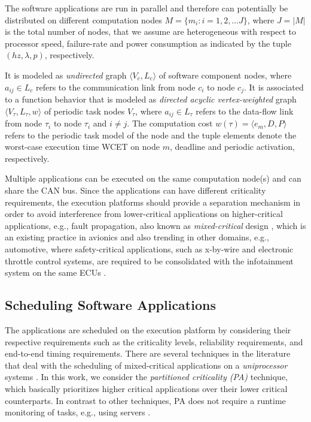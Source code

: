 The software applications are run in parallel and therefore can potentially be distributed on different computation nodes $M =\{m_i:i=1,2,\dots J\}$, where $J=|M|$ is the total number of nodes, that we assume are heterogeneous with respect to processor speed, failure-rate and power consumption as indicated by the tuple $(hz, \lambda, p)$, respectively. 

\begin{definition}
It is modeled as \textit{undirected} graph $\langle V_c,L_c\rangle$ of software component nodes, where $a_{ij}\in L_c$ refers to the communication link from node $c_i$ to node $c_j$. It is associated to a function behavior that is modeled as \textit{directed acyclic vertex-weighted} graph $\langle V_\tau,L_\tau, w\rangle$ of periodic task nodes $V_\tau$, where $a_{ij}\in L_\tau$ refers to the data-flow link from node $\tau_i$ to node $\tau_i$ and $i \neq j$. The computation cost $w(\tau)=\langle e_m,D,P\rangle$ refers to the periodic task model of the node and the tuple elements denote the worst-case execution time {WCET} on node $m$, deadline and periodic activation, respectively.
\end{definition}

Multiple applications can be executed on the same computation node(s) and can share the CAN bus. Since the applications can have different criticality requirements, the execution platforms should provide a separation mechanism in order to avoid interference from lower-critical applications on higher-critical applications, e.g., fault propagation, also known as   \textit{mixed-critical} design \cite{Vestal2007PreemptiveAssurance}, which is an existing practice in avionics and also trending in other domains, e.g., automotive, where  safety-critical applications, such as x-by-wire and electronic throttle control systems, are required to be consolidated with the infotainment system on the same ECUs \cite{bibid}.

\subsection{Scheduling Software Applications}
The applications are scheduled on the execution platform by considering their respective requirements such as the criticality levels, reliability requirements, and end-to-end timing requirements. There are several techniques in the literature that deal with the scheduling of mixed-critical applications on a \textit{uniprocessor} systems \cite{Vestal2007PreemptiveAssurance}. In this work, we consider the \textit{partitioned criticality (PA)}  technique, which basically prioritizes higher critical applications over their lower critical counterparts. In contrast to other techniques, PA does not require a runtime monitoring of tasks, e.g., using servers \cite{AbeniIntegratingSystems,Ashjaei2017DesigningSystems,Inam2014ThePlatforms}.

